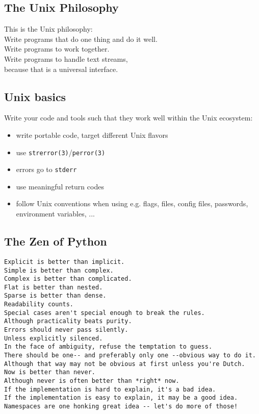 \documentclass[xga]{xdvislides}
\newcommand{\smallish}{\fontsize{15}{20}\selectfont}
\begin{document}
\subsection{The Unix Philosophy}
\begin{center}
\begin{em}
This is the Unix philosophy:\\
\vspace{.5in}
Write programs that do one thing and do it well. \\

\vspace{.5in}
Write programs to work together. \\

\vspace{.5in}
Write programs to handle text streams,\\
because that is a universal interface.
\end{em}
\end{center}

\subsection{Unix basics}
Write your code and tools such that they work well
within the Unix ecosystem:
\begin{itemize}
	\item write portable code, target different Unix flavors
	\item use \verb+strerror(3)+/\verb+perror(3)+
	\item errors go to \verb+stderr+
	\item use meaningful return codes
	\item follow Unix conventions when using e.g. flags, files, config files, passwords, environment variables, ...
\end{itemize}

\subsection{The Zen of Python}
\smallish
\begin{verbatim}
Explicit is better than implicit.
Simple is better than complex.
Complex is better than complicated.
Flat is better than nested.
Sparse is better than dense.
Readability counts.
Special cases aren't special enough to break the rules.
Although practicality beats purity.
Errors should never pass silently.
Unless explicitly silenced.
In the face of ambiguity, refuse the temptation to guess.
There should be one-- and preferably only one --obvious way to do it.
Although that way may not be obvious at first unless you're Dutch.
Now is better than never.
Although never is often better than *right* now.
If the implementation is hard to explain, it's a bad idea.
If the implementation is easy to explain, it may be a good idea.
Namespaces are one honking great idea -- let's do more of those!
\end{verbatim}
\Normalsize
\end{document}
